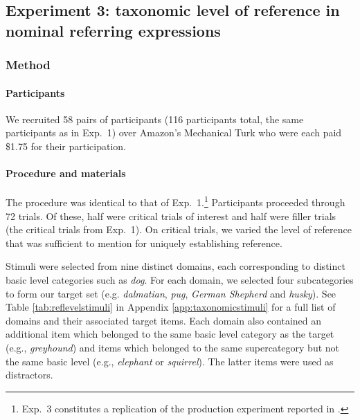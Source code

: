 \documentclass[11pt]{article}
\newcommand{\tableref}[1]{Table \ref{#1}}
\newcommand{\appref}[1]{Appendix \ref{#1}}
\begin{document}
\subsection{Experiment 3: taxonomic level of reference in nominal referring expressions}
\label{sec:exp3}

\subsubsection{Method}

\paragraph{Participants}

We recruited 58 pairs of participants (116 participants total, the same participants as in Exp.~1) over Amazon's Mechanical Turk who were each paid \$1.75 for their participation. 

\paragraph{Procedure and materials}

The procedure was identical to that of Exp.~1.\footnote{Exp.~3 constitutes a replication of the production experiment reported in .} Participants proceeded through 72 trials. Of these, half were critical trials of interest and half were filler trials (the critical trials from Exp.~1). On critical trials, we varied the level of reference that was sufficient to mention for uniquely establishing reference.

Stimuli were selected from nine distinct domains, each corresponding to distinct basic level categories such as \emph{dog}.  For each domain, we selected four subcategories to form our target set (e.g. \emph{dalmatian}, \emph{pug}, \emph{German Shepherd} and \emph{husky}). See \tableref{tab:reflevelstimuli} in \appref{app:taxonomicstimuli} for a full list of domains and their associated target items. Each domain also contained an additional item which belonged to the same basic level category as the target (e.g., \emph{greyhound}) and items which belonged to the same supercategory but not the same basic level (e.g., \emph{elephant} or \emph{squirrel}). The latter items were used as distractors.
\end{document}
